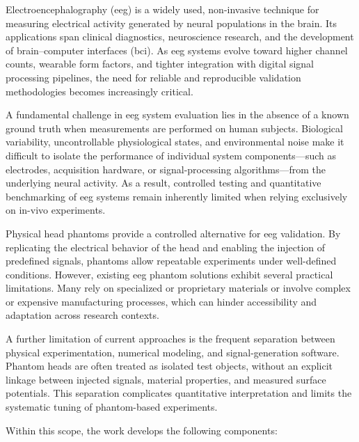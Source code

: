 \documentclass[../00_Main.tex]{subfiles}
\begin{document}
Electroencephalography (\gls{eeg}) is a widely used, non-invasive technique for measuring electrical activity generated by neural populations in the brain.
Its applications span clinical diagnostics, neuroscience research, and the development of brain--computer interfaces (\gls{bci}). As \gls{eeg} systems evolve toward
higher channel counts, wearable form factors, and tighter integration with digital signal processing pipelines, the need for reliable and reproducible validation
methodologies becomes increasingly critical.

A fundamental challenge in \gls{eeg} system evaluation lies in the absence of a known ground truth when measurements are performed on human subjects. Biological
variability, uncontrollable physiological states, and environmental noise make it difficult to isolate the performance of individual system components---such
as electrodes, acquisition hardware, or signal-processing algorithms---from the underlying neural activity. As a result, controlled testing and quantitative
benchmarking of \gls{eeg} systems remain inherently limited when relying exclusively on in-vivo experiments.

Physical head phantoms provide a controlled alternative for \gls{eeg} validation. By replicating the electrical behavior of the head and enabling the injection
of predefined signals, phantoms allow repeatable experiments under well-defined conditions. However, existing \gls{eeg} phantom solutions exhibit several practical
limitations. Many rely on specialized or proprietary materials or involve complex or expensive manufacturing processes, which can hinder accessibility and adaptation across research contexts.

A further limitation of current approaches is the frequent separation between physical experimentation, numerical modeling, and signal-generation software. Phantom heads are often treated as isolated test objects, without an explicit linkage between injected signals, material properties, and measured surface potentials. This separation complicates quantitative interpretation and limits the systematic tuning of phantom-based experiments.

Within this scope, the work develops the following components:
\end{document}
